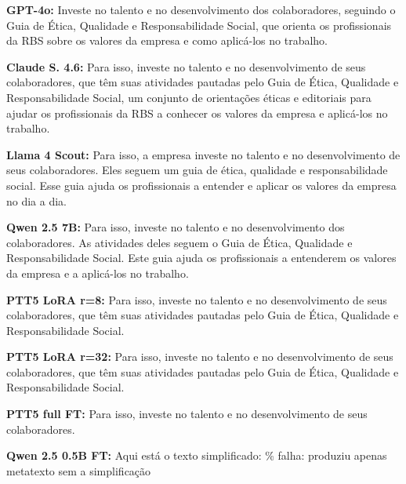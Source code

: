 \documentclass[a4paper, twocolumn, 11pt, twoside]{article}
\begin{document}
\textbf{GPT-4o:} Investe no talento e no desenvolvimento dos colaboradores, seguindo o Guia de Ética, Qualidade e Responsabilidade Social, que orienta os profissionais da RBS sobre os valores da empresa e como aplicá-los no trabalho.

\textbf{Claude S. 4.6:} Para isso, investe no talento e no desenvolvimento de seus colaboradores, que têm suas atividades pautadas pelo Guia de Ética, Qualidade e Responsabilidade Social, um conjunto de orientações éticas e editoriais para ajudar os profissionais da RBS a conhecer os valores da empresa e aplicá-los no trabalho.

\textbf{Llama 4 Scout:} Para isso, a empresa investe no talento e no desenvolvimento de seus colaboradores. Eles seguem um guia de ética, qualidade e responsabilidade social. Esse guia ajuda os profissionais a entender e aplicar os valores da empresa no dia a dia.

\textbf{Qwen 2.5 7B:} Para isso, investe no talento e no desenvolvimento dos colaboradores. As atividades deles seguem o Guia de Ética, Qualidade e Responsabilidade Social. Este guia ajuda os profissionais a entenderem os valores da empresa e a aplicá-los no trabalho.

\textbf{PTT5 LoRA r=8:} Para isso, investe no talento e no desenvolvimento de seus colaboradores, que têm suas atividades pautadas pelo Guia de Ética, Qualidade e Responsabilidade Social.

\textbf{PTT5 LoRA r=32:} Para isso, investe no talento e no desenvolvimento de seus colaboradores, que têm suas atividades pautadas pelo Guia de Ética, Qualidade e Responsabilidade Social.

\textbf{PTT5 full FT:} Para isso, investe no talento e no desenvolvimento de seus colaboradores.

\textbf{Qwen 2.5 0.5B FT:} Aqui está o texto simplificado: \% falha: produziu apenas metatexto sem a simplificação
\end{document}
